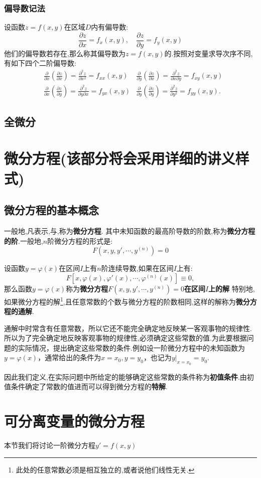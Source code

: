 \documentclass[10pt,a4paper]{article}
\begin{document}
\subsubsection{偏导数记法}
设函数$ z=f(x,y) $在区域$ D $内有偏导数:\[\frac{{\partial z}}{{\partial x}} = {f_x}(x,y),\quad \frac{{\partial z}}{{\partial y}} = {f_y}(x,y)\]他们的偏导数若存在,那么称其偏导数为$ z=f(x,y) $的.按照对变量求导次序不同,有如下四个二阶偏导数:\begin{align*}
     & \frac{\partial }{{\partial x}}\left( {\frac{{\partial z}}{{\partial x}}} \right) = \frac{{{\partial ^2}z}}{{\partial {x^2}}} = {f_{xx}}(x,y)       & \frac{\partial }{{\partial y}}\left( {\frac{{\partial z}}{{\partial x}}} \right) = \frac{{{\partial ^2}z}}{{\partial x\partial y}} = {f_{xy}}(x,y) \\[7pt]
     & \frac{\partial }{{\partial x}}\left( {\frac{{\partial z}}{{\partial y}}} \right) = \frac{{{\partial ^2}z}}{{\partial y\partial x}} = {f_{yx}}(x,y) & \frac{\partial }{{\partial y}}\left( {\frac{{\partial z}}{{\partial y}}} \right) = \frac{{{\partial ^2}z}}{{\partial {y^2}}} = {f_{yy}}(x,y).
\end{align*}
\subsection{全微分}


\section{微分方程(该部分将会采用详细的讲义样式)}
\subsection{微分方程的基本概念}
\begin{definition}[微分方程的定义]
    一般地,凡表示,与,称为\textbf{微分方程}.
    其中未知函数的最高阶导数的阶数,称为\textbf{微分方程的阶}.一般地,$n$阶微分方程的形式是:\[
        F(
        x,y,y',\cdots,y^{(n)}
        )=0
    \]
\end{definition}
\begin{definition}[微分方程的解]
    设函数$y=\varphi(x)$在区间$I$上有$n$阶连续导数,如果在区间$I$上有:\[
        F[x,\varphi(x),\varphi'(x),\cdots,\varphi^{(n)}(x)]\equiv 0,
        \]那么函数$y=\varphi(x)$称为\textbf{微分方程$  F(x,y,y',\cdots,y^{(n)})=0$在区间$I$上的解}
    特别地,如果微分方程的解\footnote{此处的任意常数必须是相互独立的,或者说他们线性无关.},且任意常数的个数与微分方程的阶数相同,这样的解称为\textbf{微分方程的通解}.

    通解中时常含有任意常数，所以它还不能完全确定地反映某一客观事物的规律性.所以为了完全确定地反映客观事物的规律性,必须确定这些常数的值.为此要根据问题的实际情况，提出确定这些常数的条件.例如设一阶微分方程中的未知函数为$y=\varphi (x)$，通常给出的条件为$x=x_0,y=y_0$，也记为$y|_{x=x_0}=y_0$.

    因此我们定义,在实际问题中所给定的能够确定这些常数的条件称为\textbf{初值条件}.由初值条件确定了常数的值进而可以得到微分方程的\textbf{特解}.
\end{definition}
\section{可分离变量的微分方程}
本节我们将讨论一阶微分方程$y'=f(x,y)$
\end{document}

